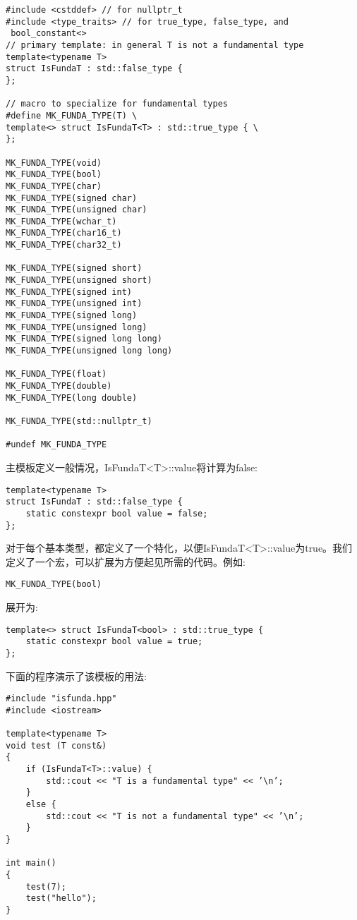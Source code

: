 \begin{lstlisting}[style=styleCXX]
#include <cstddef> // for nullptr_t
#include <type_traits> // for true_type, false_type, and
 bool_constant<>
// primary template: in general T is not a fundamental type
template<typename T>
struct IsFundaT : std::false_type {
};

// macro to specialize for fundamental types
#define MK_FUNDA_TYPE(T) \
template<> struct IsFundaT<T> : std::true_type { \
};

MK_FUNDA_TYPE(void)
MK_FUNDA_TYPE(bool)
MK_FUNDA_TYPE(char)
MK_FUNDA_TYPE(signed char)
MK_FUNDA_TYPE(unsigned char)
MK_FUNDA_TYPE(wchar_t)
MK_FUNDA_TYPE(char16_t)
MK_FUNDA_TYPE(char32_t)

MK_FUNDA_TYPE(signed short)
MK_FUNDA_TYPE(unsigned short)
MK_FUNDA_TYPE(signed int)
MK_FUNDA_TYPE(unsigned int)
MK_FUNDA_TYPE(signed long)
MK_FUNDA_TYPE(unsigned long)
MK_FUNDA_TYPE(signed long long)
MK_FUNDA_TYPE(unsigned long long)

MK_FUNDA_TYPE(float)
MK_FUNDA_TYPE(double)
MK_FUNDA_TYPE(long double)

MK_FUNDA_TYPE(std::nullptr_t)

#undef MK_FUNDA_TYPE
\end{lstlisting}

主模板定义一般情况，IsFundaT<T>::value将计算为false:

\begin{lstlisting}[style=styleCXX]
template<typename T>
struct IsFundaT : std::false_type {
	static constexpr bool value = false;
};
\end{lstlisting}

对于每个基本类型，都定义了一个特化，以便IsFundaT<T>::value为true。我们定义了一个宏，可以扩展为方便起见所需的代码。例如:

\begin{lstlisting}[style=styleCXX]
MK_FUNDA_TYPE(bool)
\end{lstlisting}

展开为:

\begin{lstlisting}[style=styleCXX]
template<> struct IsFundaT<bool> : std::true_type {
	static constexpr bool value = true;
};
\end{lstlisting}

下面的程序演示了该模板的用法:

\begin{lstlisting}[style=styleCXX]
#include "isfunda.hpp"
#include <iostream>

template<typename T>
void test (T const&)
{
	if (IsFundaT<T>::value) {
		std::cout << "T is a fundamental type" << ’\n’;
	}
	else {
		std::cout << "T is not a fundamental type" << ’\n’;
	}
}

int main()
{
	test(7);
	test("hello");
}
\end{lstlisting}

